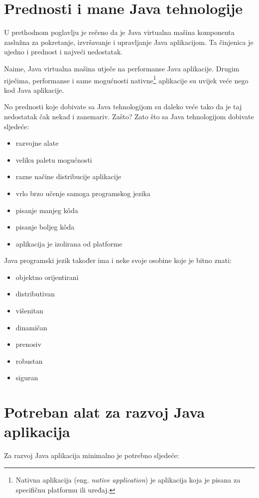 \section{Prednosti i mane Java tehnologije}
U prethodnom poglavlju je rečeno da je Java virtualna mašina komponenta zaslužna za pokretanje, izvršavanje i upravljanje Java aplikacijom. Ta činjenica je ujedno i prednost i najveći nedostatak.

Naime, Java virtualna mašina utječe na performanse Java aplikacije. Drugim riječima, performanse i same mogućnosti nativne\footnote{Nativna aplikacija (eng. \emph{native application}) je aplikacija koja je pisana za specifičnu platformu ili uređaj.} aplikacije su uvijek veće nego kod Java aplikacije.

No prednosti koje dobivate sa Java tehnologijom su daleko veće tako da je taj nedostatak čak nekad i zanemariv. Zašto? Zato što sa Java tehnologijom dobivate sljedeće:

\begin{itemize}
    \item razvojne alate
    \item veliku paletu mogućnosti
    \item razne načine distribucije aplikacije
    \item vrlo brzo učenje samoga programskog jezika
    \item pisanje manjeg kôda
    \item pisanje boljeg kôda
    \item aplikacija je izolirana od platforme
\end{itemize}

Java programski jezik također ima i neke svoje osobine koje je bitno znati:

\begin{itemize}
    \item objektno orijentirani
    \item distributivan
    \item višenitan
    \item dinamičan
    \item prenosiv
    \item robustan
    \item siguran
\end{itemize}

\section{Potreban alat za razvoj Java aplikacija}
Za razvoj Java aplikacija minimalno je potrebno sljedeće:

